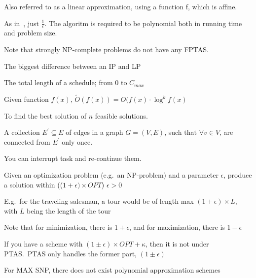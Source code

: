 \begin{definition}[F-approximation]
    Also referred to as a linear approximation, using a function f,
    which is affine.
\end{definition}

\begin{definition}\label{FPTAS}
    As in~, just $\frac{1}{\epsilon}$.
    The algoritm is required to be polynomial both in running time and problem
    size.

    Note that strongly NP-complete problems do not have any FPTAS.
\end{definition}

\begin{definition}\label{integralitygap}
    The biggest difference between an IP and LP
\end{definition}

\begin{definition}[Makespan]
    The total length of a schedule; from 0 to $C_{max}$
\end{definition}

\begin{definition}[$\tilde{O}$]\label{otilde}
    Given function $f(x)$, $\tilde{O}(f(x)) = O(f(x)\cdot{\log^{k}{f(x)}}$
\end{definition}

\begin{definition}\label{optproblem}
    To find the best solution of $n$ feasible solutions.
\end{definition}

\begin{definition}
    A collection $E^{\prime} \subseteq E$ of edges in a graph 
    $G = (V,E)$, such that $\forall v \in V$, are connected 
    from $E^{\prime}$ only once.
\end{definition}


\begin{definition}\label{pre-emptive}
    You can interrupt task and re-continue them.
\end{definition}


\begin{definition}\label{PTAS}
    Given an optimization problem (e.g.\ an NP-problem) and a parameter 
    $\epsilon$, produce a solution within (($1 + \epsilon) \times OPT$)
    $\epsilon > 0$

    E.g.\ for the traveling salesman, a tour would be of length max 
    $(1 + \epsilon) \times L$, with $L$ being the length of the tour

    Note that for minimization, there is $1 + \epsilon$, and for maximization,
    there is $1 - \epsilon$
    
    If you have a scheme with $(1 \pm \epsilon) \times OPT + \kappa$, then 
    it is not under PTAS.\ PTAS only handles the former part, $(1 \pm \epsilon)$

    For MAX SNP, there does not exist polynomial approximation schemes
\end{definition}

